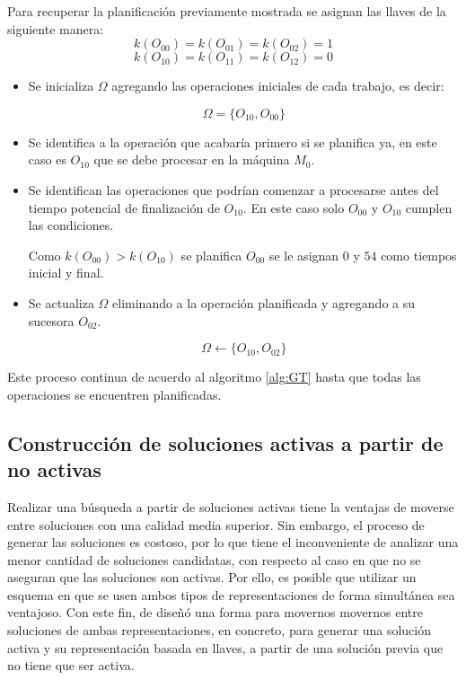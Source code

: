 Para recuperar la planificación previamente mostrada se asignan las llaves de la siguiente manera: \[k(O_{00})=k(O_{01})=k(O_{02})=1\]  \[k(O_{10})=k(O_{11})=k(O_{12})=0\]
\begin{itemize}
    \item Se inicializa $\Omega$ agregando las operaciones iniciales de cada trabajo, es decir:

\[\Omega = \{O_{10},O_{00}\}\]

     \item Se identifica a la operación que acabaría primero si se planifica ya, en este caso es $O_{10}$ que se debe procesar en la máquina $M_0$. 

     \item Se identifican las operaciones que podrían comenzar a procesarse antes del tiempo potencial de finalización de $O_{10}$. 
		 En este caso solo $O_{00}$ y  $O_{10}$ cumplen las condiciones.

Como $k(O_{00})>k(O_{10})$ se planifica $O_{00}$ se le asignan $0$ y $54$ como tiempos inicial y final.

     \item Se actualiza $\Omega$ eliminando a la operación planificada y agregando a su sucesora $O_{02}$.

\[\Omega\leftarrow \{O_{10},O_{02}\}\]
\end{itemize}
Este proceso continua de acuerdo al algoritmo \ref{alg:GT} hasta que todas las operaciones se encuentren planificadas.

\subsection{Construcción de soluciones activas a partir de no activas}

Realizar una búsqueda a partir de soluciones activas tiene la ventajas de moverse entre soluciones con una calidad media
superior.
%
Sin embargo, el proceso de generar las soluciones es costoso, por lo que tiene el inconveniente de analizar una menor
cantidad de soluciones candidatas, con respecto al caso en que no se aseguran que las soluciones son activas.
%
Por ello, es posible que utilizar un esquema en que se usen ambos tipos de representaciones de forma simultánea sea
ventajoso.
%
Con este fin, de diseñó una forma para movernos movernos entre soluciones de ambas representaciones, en concreto, para
generar una solución activa y su representación basada en llaves, a partir de una solución previa que no tiene que ser activa. 

